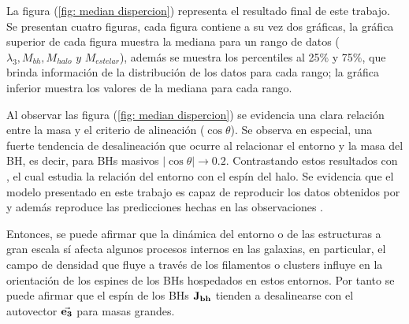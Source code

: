 La figura (\ref{fig: median dispercion}) representa el resultado final de este trabajo. Se presentan cuatro  figuras, cada figura contiene a su vez dos gráficas, la gráfica superior de cada figura muestra la mediana para un rango de datos ($\lambda_{3}, M_{bh}, M_{halo}\,\, y\,\, M_{estelar}$), además se muestra los percentiles al 25$\%$ y 75$\%$, que brinda información de la distribución de los datos para cada rango; la gráfica inferior muestra los valores de la  mediana para cada rango.

Al observar las figura (\ref{fig: median dispercion}) se evidencia una clara relación entre la masa y el criterio de alineación ($\cos\theta$). 
Se observa en especial, una fuerte tendencia de desalineación que ocurre al relacionar el entorno y la masa del BH, es decir, para BHs  masivos $|\cos\theta| \to 0.2$. Contrastando estos resultados con \cite{wang2018}, el cual estudia la relación del entorno con el espín del halo. Se evidencia que el modelo presentado en este trabajo es capaz de reproducir los datos obtenidos por \cite{wang2018} y además reproduce las predicciones hechas en las observaciones \cite{hutsemekers2014}.


Entonces, se puede afirmar que la dinámica del entorno o de las  estructuras a gran escala sí afecta algunos procesos internos en las galaxias, en particular, el campo de densidad que fluye a través de los filamentos o clusters influye en la orientación de los espines de los BHs hospedados en estos entornos. Por tanto se puede afirmar que  el espín de los BHs ${\bf{J_{bh}}}$ tienden a desalinearse con el autovector $\vec{\bf{e}_3}$ para masas grandes. 
%

